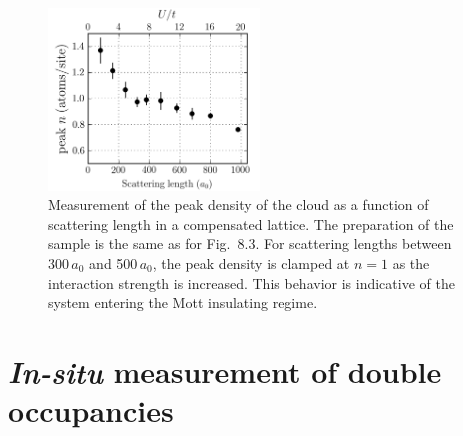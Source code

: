 \begin{figure}
\centering
\includegraphics[width=0.5\textwidth]{../figures/double_occ/insitu_Dens.png}
\caption[Density measurement]{Measurement of the peak density of the cloud as a
function of scattering length in a compensated lattice. The preparation of the
sample is the same as for Fig.~8.3.  For scattering lengths between
300\,$a_{0}$ and 500\,$a_{0}$, the peak density is clamped at $n=1$ as the
interaction strength is increased.  This behavior is indicative of the system
entering the Mott insulating regime.  } 
\label{fig:dens-5.5Er}
\end{figure}

\section{\textit{In-situ} measurement of double occupancies}

